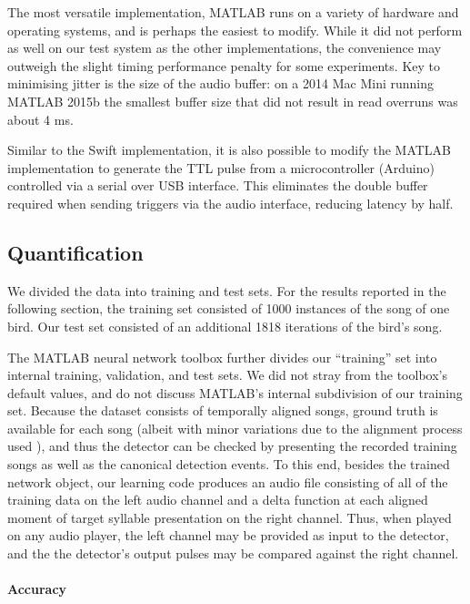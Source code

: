 \documentclass[10pt,letterpaper]{article}
\renewcommand{\subsubsection}[1]{\paragraph{#1}}
\begin{document}
The most versatile implementation, MATLAB runs on a variety of
hardware and operating systems, and is perhaps the easiest to modify.
While it did not perform as well on our test system as the other
implementations, the convenience may outweigh the slight timing
performance penalty for some experiments.  Key to minimising jitter is
the size of the audio buffer: on a 2014 Mac Mini running MATLAB 2015b
the smallest buffer size that did not result in read overruns was
about 4 ms.

Similar to the Swift implementation, it is also possible to modify the
MATLAB implementation to generate the TTL pulse from a microcontroller
(Arduino) controlled via a serial over USB interface. This eliminates
the double buffer required when sending triggers via the audio
interface, reducing latency by half.

\subsection{Quantification}
\label{sec:quantify}

We divided the data into training and test sets.  For the results
reported in the following section, the training set consisted of 1000
instances of the song of one bird.
Our test set consisted of an additional 1818 iterations of the bird's
song.

The MATLAB neural network toolbox further divides our ``training'' set
into internal training, validation, and test sets.  We did not stray
from the toolbox's default values, and do not discuss MATLAB's
internal subdivision of our training set.  Because the dataset
consists of temporally aligned songs, ground truth is available for
each song (albeit with minor variations due to the alignment process
used \cite{Poole2012}), and thus the detector can be checked by
presenting the recorded training songs as well as the canonical
detection events. To this end, besides the trained network object, our
learning code produces an audio file consisting of all of the training
data on the left audio channel and a delta function at each aligned
moment of target syllable presentation on the right channel. Thus,
when played on any audio player, the left channel may be provided as
input to the detector, and the the detector's output pulses may be
compared against the right channel.


\subsubsection{Accuracy}
\label{sec:accuracy}
\end{document}
